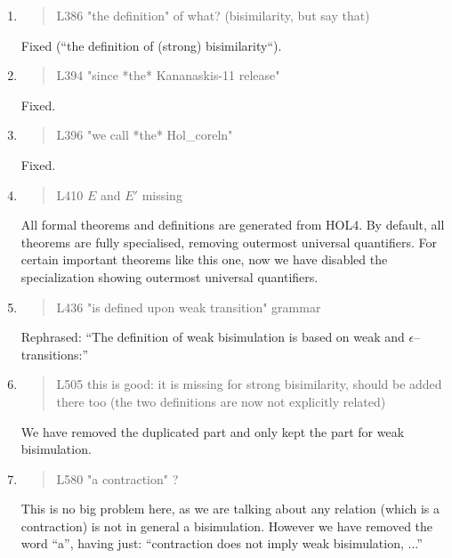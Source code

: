 \begin{enumerate}
\item \begin{quote}
    L386 "the definition" of what? (bisimilarity, but say that)
  \end{quote}
  Fixed (``the definition of (strong) bisimilarity``).
  
\item \begin{quote}
    L394 "since *the* Kananaskis-11 release"
  \end{quote}
  Fixed.

\item \begin{quote}
    L396 "we call *the* Hol_coreln"
  \end{quote}
  Fixed.
  
\item \begin{quote}
    L410 $E$ and $E'$ missing
  \end{quote}
  All formal theorems and definitions are generated from HOL4.
  By default, all theorems are fully specialised, removing outermost
  universal quantifiers. For certain important theorems like this one,
  now we have disabled the specialization showing outermost
  universal quantifiers.
  
\item \begin{quote}
    L436 "is defined upon weak transition" grammar
  \end{quote}

  Rephrased: ``The definition of weak bisimulation is based on weak
  and $\epsilon$--transitions:''
  
\item \begin{quote}
    L505 this is good: it is missing for strong bisimilarity, should
    be added there too (the two definitions are now not explicitly
    related)
  \end{quote}
  We have removed the duplicated part and only kept the part for weak bisimulation.

\item \begin{quote}
    L580 "a contraction" ?
  \end{quote}
  This is no big problem here, as we are talking about any relation
  (which is a contraction) is not in general a bisimulation. However
  we have removed the word ``a'', having just: ``contraction does not imply weak bisimulation, ...''
  

\end{enumerate}
